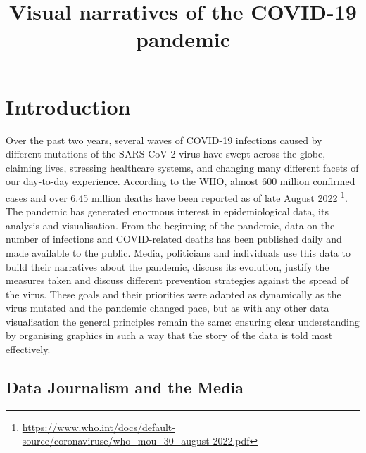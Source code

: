 \documentclass[article]{jdssv}\usepackage[]{graphicx}\usepackage[]{xcolor}
\author{
   \And }
\title{Visual narratives of the COVID-19 pandemic}
\begin{document}







\section{Introduction}

Over the past two years, several waves of COVID-19 infections caused by different mutations of the SARS-CoV-2 virus have swept across the globe, claiming lives, stressing healthcare systems, and changing many different facets of our day-to-day experience. According to the WHO, almost 600 million confirmed cases and over 6.45 million deaths have been reported as of late August 2022 \footnote{\url{https://www.who.int/docs/default-source/coronaviruse/who_mou_30_august-2022.pdf}}. The pandemic has generated enormous interest in epidemiological data, its analysis and visualisation. From the beginning of the pandemic, data on the number of infections and COVID-related deaths has been published daily and made available to the public. Media, politicians and individuals use this data to build their narratives about the pandemic, discuss its evolution, justify the measures taken and discuss different prevention strategies against the spread of the virus. %
These goals and their priorities were adapted as dynamically as the virus mutated and the pandemic changed pace, but as with any other data visualisation the general principles remain the same: ensuring clear understanding by organising graphics in such a way that the story of the data is told most effectively.

\subsection{Data Journalism and the Media}
\end{document}
